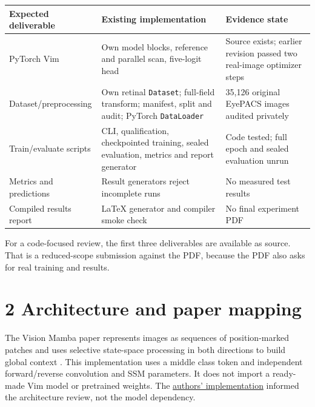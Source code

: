 \documentclass[10pt,a4paper]{article}
\newcommand{\tagline}[1]{\colorbox{sky}{\parbox{\dimexpr\linewidth-2\fboxsep}{\small #1}}}
\newcommand{\code}[1]{\texttt{\small #1}}
\begin{document}
\small
\begin{tabularx}{\linewidth}{@{}p{.22\linewidth}Y p{.20\linewidth}@{}}
\toprule
Expected deliverable & Existing implementation & Evidence state\\
\midrule
PyTorch Vim & Own model blocks, reference and parallel scan, five-logit head &
Source exists; earlier revision passed two real-image optimizer steps\\
Dataset/preprocessing & Own retinal \code{Dataset}; full-field transform;
manifest, split and audit; PyTorch \code{DataLoader} &
35,126 original EyePACS images audited privately\\
Train/evaluate scripts & CLI, qualification, checkpointed training, sealed
evaluation, metrics and report generator &
Code tested; full epoch and sealed evaluation unrun\\
Metrics and predictions & Result generators reject incomplete runs &
No measured test results\\
Compiled results report & LaTeX generator and compiler smoke check &
No final experiment PDF\\
\bottomrule
\end{tabularx}
\normalsize

\tagline{For a code-focused review, the first three deliverables are available
as source. That is a reduced-scope submission against the PDF, because the
PDF also asks for real training and results.}


\section*{\color{ink}2 \quad Architecture and paper mapping}
The Vision Mamba paper represents images as sequences of position-marked
patches and uses selective state-space processing in both directions to build
global context \cite{vim}. This implementation uses a middle class token and
independent forward/reverse convolution and SSM parameters. It does not import
a ready-made Vim model or pretrained weights. The
\href{https://github.com/hustvl/Vim}{authors' implementation} informed the
architecture review, not the model dependency.
\end{document}
